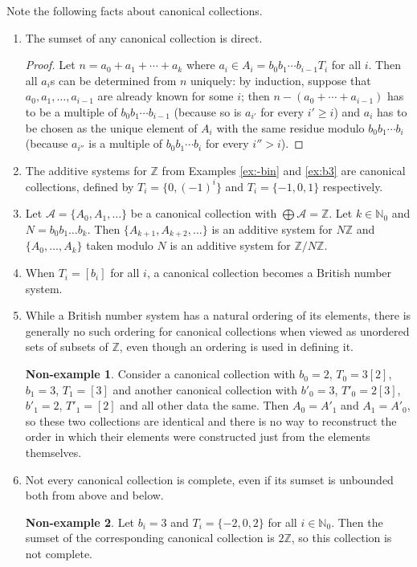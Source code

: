\documentclass[12pt]{article}
\theoremstyle{definition}
\newtheorem{nonexample}{Non-example}
\newcommand{\N}{\mathbb{N}}
\newcommand{\Z}{\mathbb{Z}}
\begin{document}
Note the following facts about canonical collections.
\begin{enumerate}%
\item \label{p:dir} The sumset of any canonical collection is direct.
	\begin{proof}
	Let $n = a_0+a_1+\dotsb +a_k$ where $a_i\in A_i = b_0b_1\dotsb b_{i-1}T_i$ for all $i$. Then all $a_i$s can be determined from $n$ uniquely: by induction, suppose that $a_0,a_1,\dots,a_{i-1}$ are already known for some $i$; then $ n - (a_0+\dotsb+a_{i-1})$ has to be a multiple of $b_0b_1\dotsb b_{i-1}$ (because so is $a_{i'}$ for every $i'\geqslant i$) and $a_i$ has to be chosen as the unique element of $A_i$ with the same residue modulo $b_0b_1\dotsb b_{i}$ (because $a_{i''}$ is a multiple of $b_0b_1\dotsb b_{i}$ for every $i''>i$).
	\end{proof}
\item The additive systems for $\Z$ from Examples \ref{ex:-bin} and \ref{ex:b3} are canonical collections, defined by $T_i=\{0,(-1)^i\}$ and $T_i=\{-1,0,1\}$ respectively.
\item \label{p:sumNZ} Let $\mathcal{A}=\{A_0,A_1,\dotsc\}$ be a canonical collection with $\bigoplus\mathcal{A}=\Z$. Let $k\in\N_0$
 and $N=b_0b_1\dots b_k$. Then $\{A_{k+1}, A_{k+2},\dotsc\}$ is an additive system for $N\Z$ and $\{A_0,\dotsc,A_k\}$ taken modulo $N$ is an additive system for $\Z/N\Z$.
\item When $T_i=[b_i]$ for all $i$, a canonical collection becomes a British number system.
\item While a British number system has a natural ordering of its elements, there is generally no such ordering for canonical collections when viewed as unordered sets of subsets of $\Z$, even though an ordering is used in defining it.
	\begin{nonexample}
	Consider a canonical collection with $b_0=2$, $T_0=3[2]$, $b_1=3$, $T_1=[3]$ and another canonical collection with $b'_0=3$, $T'_0=2[3]$, $b'_1=2$, $T'_1=[2]$ and all other data the same. Then $A_0=A'_1$ and $A_1=A'_0$, so these two collections are identical and there is no way to reconstruct the order in which their elements were constructed just from the elements themselves.
	\end{nonexample}
\item Not every canonical collection is complete, even if its sumset is unbounded both from above and below.
	\begin{nonexample}
	\label{ex:badnbin}
	Let $b_i=3$ and $T_i=\{-2,0,2\}$ for all $i\in\N_0$. Then the sumset of the corresponding canonical collection is $2\Z$, so this collection is not complete.

\end{nonexample}
\end{enumerate}
\end{document}
